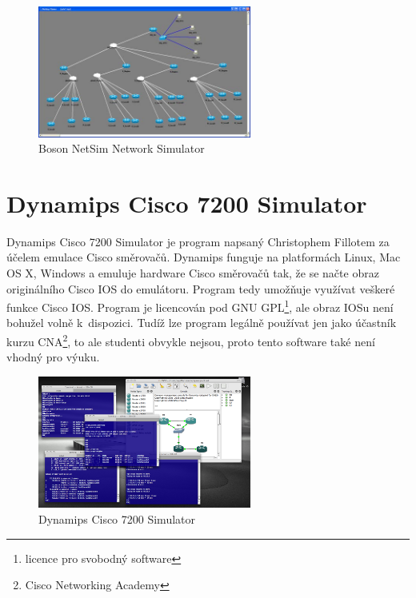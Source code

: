 \begin{figure}[h]
\begin{center}
\includegraphics[width=7cm]{figures/r_boson}
\caption{Boson NetSim Network Simulator}
\label{fig:r_boson}
\end{center}
\end{figure}

\section{Dynamips Cisco 7200 Simulator}
Dynamips Cisco 7200 Simulator \cite{reserse:dynamips} je program napsaný Christophem Fillotem za účelem emulace Cisco směrovačů. Dynamips funguje na platformách Linux, Mac OS X, Windows a emuluje hardware Cisco směrovačů tak, že se načte obraz originálního Cisco IOS do emulátoru. Program tedy umožňuje využívat veškeré funkce Cisco IOS. Program je licencován pod GNU GPL\footnote{licence pro svobodný software}, ale obraz IOSu není bohužel volně k~dispozici. Tudíž lze program legálně používat jen jako účastník kurzu CNA\footnote{Cisco Networking Academy}, to ale studenti obvykle nejsou, proto tento software také není vhodný pro výuku.

\begin{figure}[h]
\begin{center}
\includegraphics[width=7cm]{figures/r_dynamips}
\caption{Dynamips Cisco 7200 Simulator}
\label{fig:r_dynamips}
\end{center}
\end{figure}

\newpage

